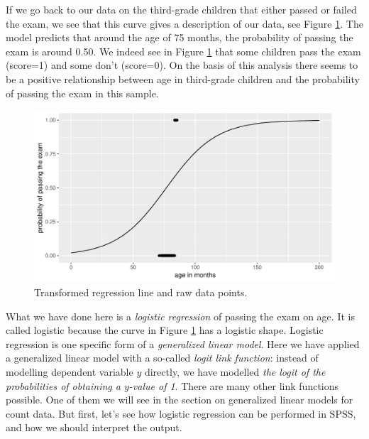 \documentclass[]{report}\usepackage[]{graphicx}\usepackage[]{color}
\makeatletter
\def\maxwidth{ %
  \ifdim\Gin@nat@width>\linewidth
    \linewidth
  \else
    \Gin@nat@width
  \fi
}
\newenvironment{knitrout}{}{} %
\makeatother
\begin{document}
If we go back to our data on the third-grade children that either passed or failed the exam, we see that this curve gives a description of our data, see Figure \ref{fig:gen_11}. The model predicts that around the age of 75 months, the probability of passing the exam is around 0.50. We indeed see in Figure \ref{fig:gen_11} that some children pass the exam (score=1) and some don't (score=0). On the basis of this analysis there seems to be a positive relationship between age in third-grade children and the probability of passing the exam in this sample.

\begin{knitrout}
\color{fgcolor}\begin{figure}

{\centering \includegraphics[width=\maxwidth]{figure/gen_11-1} 

}

\caption[Transformed regression line and raw data points]{Transformed regression line and raw data points.}\label{fig:gen_11}
\end{figure}


\end{knitrout}

What we have done here is a \textit{logistic regression} of passing the exam on age. It is called logistic because the curve in Figure \ref{fig:gen_11} has a logistic shape. Logistic regression is one specific form of a \textit{generalized linear model}. Here we have applied a generalized linear model with a so-called \textit{logit link function}: instead of modelling dependent variable $y$ directly, we have modelled \textit{the logit of the probabilities of obtaining a $y$-value of 1}. There are many other link functions possible. One of them we will see in the section on generalized linear models for count data. But first, let's see how logistic regression can be performed in SPSS, and how we should interpret the output.
\end{document}
